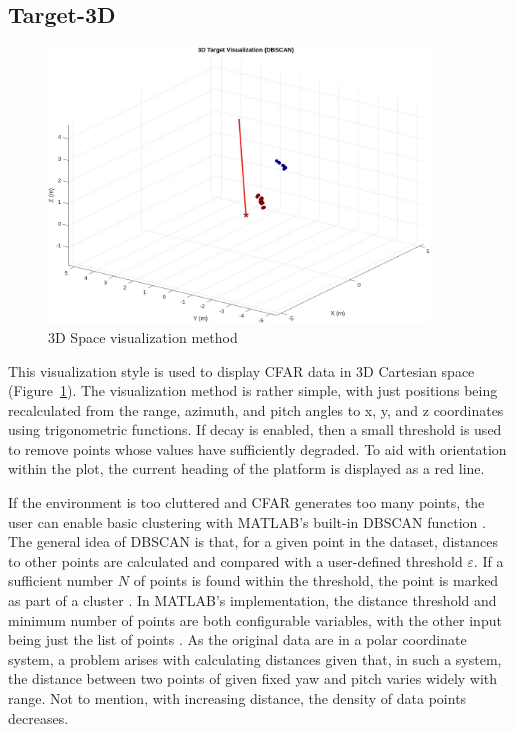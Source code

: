 \subsection{Target-3D}

\begin{figure}[h!]
	\centering
	\includegraphics[width=0.9\textwidth]{../img/vis_3d.jpg}
	\caption[3D Space visualization method]{3D Space visualization method}
	\label{fig:vis3d}
\end{figure}

This visualization style is used to display CFAR data in 3D Cartesian space (Figure~\ref{fig:vis3d}).
The visualization method is rather simple, with just positions being recalculated from the range, azimuth, and pitch angles to x, y, and z coordinates using trigonometric functions.
If decay is enabled, then a small threshold is used to remove points whose values have sufficiently degraded.
To aid with orientation within the plot, the current heading of the platform is displayed as a red line.

If the environment is too cluttered and CFAR generates too many points, the user can enable basic clustering with MATLAB's built-in DBSCAN function \cite{matlab_dbscan}.
The general idea of DBSCAN is that, for a given point in the dataset, distances to other points are calculated and compared with a user-defined threshold $\varepsilon$.
If a sufficient number $N$ of points is found within the threshold, the point is marked as part of a cluster \cite{Kellner2012}.
In MATLAB's implementation, the distance threshold and minimum number of points are both configurable variables, with the other input being just the list of points \cite{matlab_dbscan}.
As the original data are in a polar coordinate system, a problem arises with calculating distances given that, in such a system, the distance between two points of given fixed yaw and pitch varies widely with range.
Not to mention, with increasing distance, the density of data points decreases.

